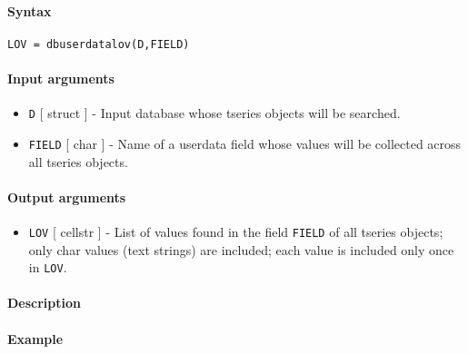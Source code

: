 


	\paragraph{Syntax}

\begin{verbatim}
LOV = dbuserdatalov(D,FIELD)
\end{verbatim}

\paragraph{Input arguments}

\begin{itemize}
\item
  \texttt{D} {[} struct {]} - Input database whose tseries objects will
  be searched.
\item
  \texttt{FIELD} {[} char {]} - Name of a userdata field whose values
  will be collected across all tseries objects.
\end{itemize}

\paragraph{Output arguments}

\begin{itemize}
\itemsep1pt\parskip0pt
\item
  \texttt{LOV} {[} cellstr {]} - List of values found in the field
  \texttt{FIELD} of all tseries objects; only char values (text strings)
  are included; each value is included only once in \texttt{LOV}.
\end{itemize}

\paragraph{Description}

\paragraph{Example}


